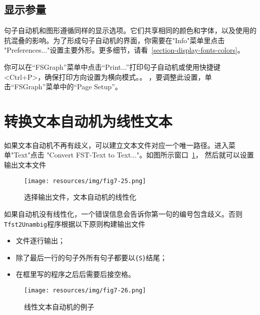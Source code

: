 
\subsection{显示参量}
句子自动机和图形遵循同样的显示选项。它们共享相同的颜色和字体，以及使用的抗混叠的影响。为了形成句子自动机的界面，你需要在"Info"菜单里点击 "Preferences..."设置主要外形。更多细节，请看~\ref{section-display-fonts-colors}。


\bigskip
\noindent
你可以在“FSGraph”菜单中点击“Print...”打印句子自动机或使用快捷键<Ctrl+P>，确保打印方向设置为横向模式。。 ，要调整此设置，单击“FSGraph”菜单中的“Page Setup”。



\section{转换文本自动机为线性文本}
\label{section-linear-text}
如果文本自动机不再有歧义，可以建立文本文件对应一个唯一路径。进入菜单"Text"点击 "Convert FST-Text to Text..."。如图所示窗口~\ref{fig-linearization-configuration}，
然后就可以设置输出文本文件


\begin{figure}[!ht]
\begin{center}
\texttt{[image: resources/img/fig7-25.png]}
\caption{选择输出文件，文本自动机的线性化\label{fig-linearization-configuration}}
\end{center}
\end{figure}

\bigskip
\noindent
如果自动机没有线性化，一个错误信息会告诉你第一句的编号包含歧义。否则 \verb+Tfst2Unambig+程序根据以下原则构建输出文件


\begin{itemize}
  \item 文件逐行输出；
  \item 除了最后一行的句子外所有句子都要以\verb+{S}+结尾；
  \item 在框里写的程序之后后需要后接空格。
\end{itemize}

\begin{figure}[!ht]
\begin{center}
\texttt{[image: resources/img/fig7-26.png]}
\caption{线性文本自动机的例子\label{fig-linear-automaton}}
\end{center}
\end{figure}

